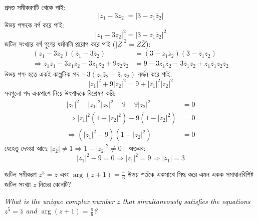 \documentclass[12pt, a4paper]{article}
\begin{document}
\begin{tcolorbox}[solutionbox={সমাধান (Solution)}]
    \noindent
    প্রদত্ত সমীকরণটি থেকে পাই:
    \[ |z_1 - 3z_2| = |3 - z_1 \bar{z}_2| \]
    উভয় পক্ষকে বর্গ করে পাই:
    \[ |z_1 - 3z_2|^2 = |3 - z_1 \bar{z}_2|^2 \]
    জটিল সংখ্যার বর্গ গুণের ধর্মাবলি প্রয়োগ করে পাই ($|Z|^2 = Z\bar{Z}$):
    \begin{align*}
        (z_1 - 3z_2)(\bar{z}_1 - 3\bar{z}_2) &= (3 - z_1 \bar{z}_2)(3 - \bar{z}_1 z_2) \\
        \Rightarrow z_1 \bar{z}_1 - 3z_1 \bar{z}_2 - 3\bar{z}_1 z_2 + 9z_2 \bar{z}_2 &= 9 - 3z_1 \bar{z}_2 - 3\bar{z}_1 z_2 + z_1 \bar{z}_1 z_2 \bar{z}_2
    \end{align*}
    উভয় পক্ষ হতে একই কাল্পনিক পদ $-3(z_1 \bar{z}_2 + \bar{z}_1 z_2)$ বর্জন করে পাই:
    \[ |z_1|^2 + 9|z_2|^2 = 9 + |z_1|^2 |z_2|^2 \]
    সবগুলো পদ একপাশে নিয়ে উৎপাদকে বিশ্লেষণ করি:
    \begin{align*}
        |z_1|^2 - |z_1|^2 |z_2|^2 - 9 + 9|z_2|^2 &= 0 \\
        \Rightarrow |z_1|^2(1 - |z_2|^2) - 9(1 - |z_2|^2) &= 0 \\
        \Rightarrow (|z_1|^2 - 9)(1 - |z_2|^2) &= 0
    \end{align*}
    যেহেতু দেওয়া আছে $|z_2| \neq 1 \Rightarrow 1 - |z_2|^2 \neq 0$। অতএব:
    \[ |z_1|^2 - 9 = 0 \Rightarrow |z_1|^2 = 9 \Rightarrow |z_1| = 3 \]
\end{tcolorbox}

\vspace{1em}

\begin{tcolorbox}[questionbox={প্রশ্ন (Question) 19}]
    \noindent
    জটিল সমীকরণ $z^5 = \bar{z}$ এবং $\arg(z + 1) = \frac{\pi}{6}$ উভয় শর্তকে একসাথে সিদ্ধ করে এমন একক সমাধানবিশিষ্ট জটিল সংখ্যা $z$ নিচের কোনটি?
    
    \vspace{0.8em}
    \begin{english}
    \noindent\textit{\color{darkgray}
    What is the unique complex number $z$ that simultaneously satisfies the equations $z^5 = \bar{z}$ and $\arg(z + 1) = \frac{\pi}{6}$?
    }
    \end{english}
\end{tcolorbox}
\end{document}
